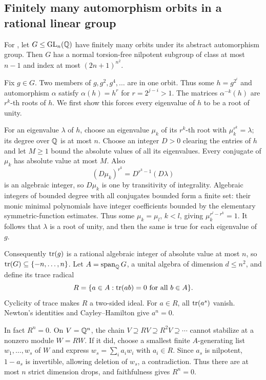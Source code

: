 \subsection{Finitely many automorphism orbits in a rational linear group}
\label{cand:21.40}

For , let \(G\leq\operatorname{GL}_n(\mathbb Q)\) have finitely
many orbits under its abstract automorphism group.
Then \(G\) has a normal torsion-free nilpotent subgroup
of class at most \(n-1\) and index at most
\((2n+1)^{n^2}\).

Fix \(g\in G\). Two members of \(g,g^2,g^4,\ldots\)
are in one orbit. Thus some \(h=g^{2^i}\) and
automorphism \(\alpha\) satisfy \(\alpha(h)=h^r\)
for \(r=2^{j-i}>1\). The matrices
\(\alpha^{-k}(h)\) are \(r^k\)-th roots of \(h\).
We first show this forces every eigenvalue of \(h\)
to be a root of unity.

For an eigenvalue \(\lambda\) of \(h\), choose an
eigenvalue \(\mu_k\) of its \(r^k\)-th root with
\(\mu_k^{r^k}=\lambda\); its degree over \(\mathbb Q\)
is at most \(n\). Choose an integer \(D>0\) clearing
the entries of \(h\) and let \(M\geq1\) bound the
absolute values of all its eigenvalues. Every conjugate
of \(\mu_k\) has absolute value at most \(M\).
Also
\[
 (D\mu_k)^{r^k}=D^{r^k-1}(D\lambda)
\]
is an algebraic integer, so \(D\mu_k\) is one by
transitivity of integrality. Algebraic integers of
bounded degree with all conjugates bounded form a
finite set: their monic minimal polynomials have
integer coefficients bounded by the elementary
symmetric-function estimates. Thus some
\(\mu_k=\mu_l\), \(k<l\), giving
\(\mu_k^{r^l-r^k}=1\). It follows that \(\lambda\)
is a root of unity, and then the same is true for
each eigenvalue of \(g\).

Consequently \(\operatorname{tr}(g)\) is a rational algebraic integer
of absolute value at most \(n\), so
\(\operatorname{tr}(G)\subseteq\{-n,\ldots,n\}\).
Let \(A=\operatorname{span}_{\mathbb Q}G\), a unital algebra
of dimension \(d\leq n^2\), and define its trace radical
\[
 R=\{a\in A:\operatorname{tr}(ab)=0\text{ for all }b\in A\}.
\]
Cyclicity of trace makes \(R\) a two-sided ideal.
For \(a\in R\), all \(\operatorname{tr}(a^s)\) vanish. Newton's
identities and Cayley--Hamilton give \(a^n=0\).

In fact \(R^n=0\). On \(V=\mathbb Q^n\), the chain
\(V\supseteq RV\supseteq R^2V\supseteq\cdots\)
cannot stabilize at a nonzero module \(W=RW\).
If it did, choose a smallest finite \(A\)-generating
list \(w_1,\ldots,w_s\) of \(W\) and express
\(w_s=\sum_i a_iw_i\) with \(a_i\in R\).
Since \(a_s\) is nilpotent, \(1-a_s\) is invertible,
allowing deletion of \(w_s\), a contradiction.
Thus there are at most \(n\) strict dimension drops,
and faithfulness gives \(R^n=0\).

